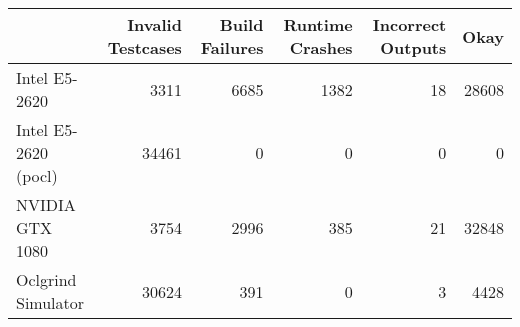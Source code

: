 \begin{tabular}{lrrrrr}
\toprule
{} &  Invalid Testcases &  Build Failures &  Runtime Crashes &  Incorrect Outputs &   Okay \\
\midrule
Intel E5-2620        &               3311 &            6685 &             1382 &                 18 &  28608 \\
Intel E5-2620 (pocl) &              34461 &               0 &                0 &                  0 &      0 \\
NVIDIA GTX 1080      &               3754 &            2996 &              385 &                 21 &  32848 \\
Oclgrind Simulator   &              30624 &             391 &                0 &                  3 &   4428 \\
\bottomrule
\end{tabular}
